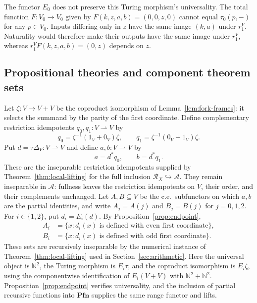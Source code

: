 \documentclass[11pt]{article}
\newcommand{\N}{\mathbb N}
\newcommand{\Pfn}{\mathbf{Pfn}}
\begin{document}
The functor $E_0$ does not preserve this Turing morphism's universality.
The total function $F:V_0\to V_0$ given by
$F(k,z,a,b)=(0,0,z,0)$ cannot equal $\tau_0(p,-)$ for any $p\in V_0$.
Inputs differing only in $z$ have the same image $(k,a)$ under
$r_1^V$. Naturality would therefore make their outputs have the
same image under $r_1^V$, whereas
$r_1^V F(k,z,a,b)=(0,z)$ depends on $z$.

\subsection{Propositional theories and component theorem sets}

Let $\zeta:V\to V+V$ be the coproduct isomorphism of
Lemma~\ref{lem:fork-frames}: it selects the summand by the parity
of the first coordinate. Define complementary restriction idempotents
$q_0,q_1:V\rightharpoonup V$ by
\[
 q_0=\zeta^{-1}(1_V+0_V)\zeta,\qquad
 q_1=\zeta^{-1}(0_V+1_V)\zeta.
\]
Put $d=\tau\Delta_V:V\rightharpoonup V$ and define
$a,b:V\rightharpoonup V$ by
\[
 a=d^*q_0,\qquad b=d^*q_1.
\]
These are the inseparable restriction idempotents supplied by
Theorem~\ref{thm:local-lifting} for the full inclusion
$\mathscr R_X\hookrightarrow\mathcal A$. They remain inseparable
in $\mathcal A$: fullness leaves the restriction idempotents on $V$, their order,
and their complements unchanged.
Let $A,B\subseteq V$ be the c.e.\ subfunctors on which $a,b$
are the partial identities, and write $A_j=A(j)$ and $B_j=B(j)$
for $j=0,1,2$. For $i\in\{1,2\}$, put $d_i=E_i(d)$.
By Proposition~\ref{prop:endpoint},
\begin{align*}
 A_i&=\{x:d_i(x)\text{ is defined with even first coordinate}\},\\
 B_i&=\{x:d_i(x)\text{ is defined with odd first coordinate}\}.
\end{align*}
These sets are recursively inseparable by the numerical instance
of Theorem~\ref{thm:local-lifting} used in
Section~\ref{sec:arithmetic}. Here the universal object is $\N^2$,
the Turing morphism is $E_i\tau$, and the coproduct isomorphism
is $E_i\zeta$, using the componentwise identification of
$E_i(V+V)$ with $\N^2+\N^2$. Proposition~\ref{prop:endpoint}
verifies universality, and the inclusion of partial recursive
functions into $\Pfn$ supplies the same range functor and lifts.
\end{document}
